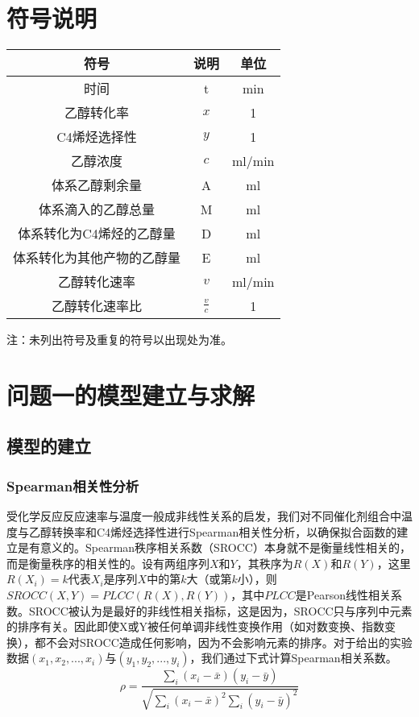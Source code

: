 \documentclass[withoutpreface,bwprint]{cumcmthesis} %
\begin{document}
\bigskip

\section{符号说明}
\begin{table}[!htbp]
	\centering
	\begin{tabular}{ccc}
		\toprule[1.5pt]
		符号 & 说明 & 单位 \\
		\midrule[1.5pt]
		时间 & t & min \\
		乙醇转化率 & $x$ & 1 \\
		C4烯烃选择性 & $y$ & 1 \\
		乙醇浓度& $c$  &  ml/min \\
		体系乙醇剩余量 & A&  ml\\ 
		体系滴入的乙醇总量 & M & ml \\
		体系转化为C4烯烃的乙醇量 & D  & ml \\
		体系转化为其他产物的乙醇量 & E &  ml \\
		乙醇转化速率 & $v$  & ml/min \\
		乙醇转化速率比 & $\frac{v}{c}$ &  1\\	
		\bottomrule[1.5pt]
	\end{tabular}
\end{table}
注：未列出符号及重复的符号以出现处为准。



\newpage
\section{问题一的模型建立与求解}
\subsection{模型的建立}
\subsubsection{Spearman相关性分析}
受化学反应反应速率与温度一般成非线性关系的启发，我们对不同催化剂组合中温度与乙醇转换率和C4烯烃选择性进行Spearman相关性分析，以确保拟合函数的建立是有意义的。Spearman秩序相关系数（SROCC）本身就不是衡量线性相关的，而是衡量秩序的相关性的。设有两组序列$X$和$Y$，其秩序为$R(X)$和$R(Y)$，这里$R(X_i)=k$代表$X_i$是序列$X$中的第$k$大（或第$k$小），则$SROCC(X, Y) = PLCC(R(X), R(Y))$，其中$PLCC$是Pearson线性相关系数。SROCC被认为是最好的非线性相关指标，这是因为，SROCC只与序列中元素的排序有关。因此即使X或Y被任何单调非线性变换作用（如对数变换、指数变换），都不会对SROCC造成任何影响，因为不会影响元素的排序。对于给出的实验数据$(x_1,x_2,...,x_i)$与$(y_1,y_2,...,y_i)$，我们通过下式计算Spearman相关系数。
\begin{equation}
	\rho=\frac{\sum_{i}\left(x_{i}-\bar{x}\right)\left(y_{i}-\bar{y}\right)}{\sqrt{\sum_{i}\left(x_{i}-\bar{x}\right)^{2} \sum_{i}\left(y_{i}-\bar{y}\right)^{2}}}
\end{equation}
\end{document}
